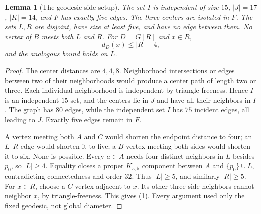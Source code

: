 \documentclass[11pt]{article}
\newtheorem{lemma}[theorem]{Lemma}
\begin{document}
\begin{lemma}[The geodesic side setup]\label{setup}
The set $I$ is independent of size $15$, $|J|=17$, $|K|=14$,
and $F$ has exactly five edges. The three centers are isolated in $F$.
The sets $L,R$ are disjoint, have size at least five, and have no edge
between them. No vertex of $B$ meets both $L$ and $R$.
For $D=G[R]$ and $x\in R$,
\[
 d_D(x)\leq |R|-4,                                  \tag{1}
\]
and the analogous bound holds on $L$.
\end{lemma}
\begin{proof}
The center distances are $4,4,8$. Neighborhood intersections or
edges between two of their neighborhoods would produce a center path
of length two or three. Each individual neighborhood is independent
by triangle-freeness. Hence $I$ is an independent $15$-set, and the
centers lie in $J$ and have all their neighbors in $I$.
The graph has $80$ edges, while the independent set $I$ has $75$
incident edges, all leading to $J$. Exactly five edges remain in $F$.

A vertex meeting both $A$ and $C$ would shorten the endpoint distance
to four; an $L$--$R$ edge would shorten it to five; a $B$-vertex
meeting both sides would shorten it to six. None is possible.
Every $a\in A$ needs four distinct neighbors in $L$ besides $p_0$,
so $|L|\geq4$. Equality closes a proper $K_{5,5}$ component between
$A$ and $\{p_0\}\cup L$, contradicting connectedness and order $32$.
Thus $|L|\geq5$, and similarly $|R|\geq5$.
For $x\in R$, choose a $C$-vertex adjacent to $x$. Its other three
side neighbors cannot neighbor $x$, by triangle-freeness. This gives
(1). Every argument used only the fixed geodesic, not global diameter.
\end{proof}
\end{document}
